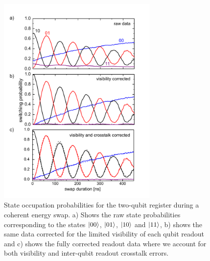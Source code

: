 \smallskip

\begin{figure}[ht!]
	\centering
	\includegraphics[width=0.7\textwidth]{"./material/papers/iswap/figures/swap_raw_and_corrected"}
	\caption[]{State occupation probabilities for the two-qubit register during a coherent energy swap. a) Shows the raw state probabilities corresponding to the states $\left| 00 \right>$, $\left| 01 \right>$, $\left| 10 \right>$ and $\left| 11 \right>$, b) shows the same data corrected for the limited visibility of each qubit readout and c) shows the fully corrected readout data where we account for both visibility and inter-qubit readout crosstalk errors.}
	\label{fig:swap_raw_and_corrected}
\end{figure}

